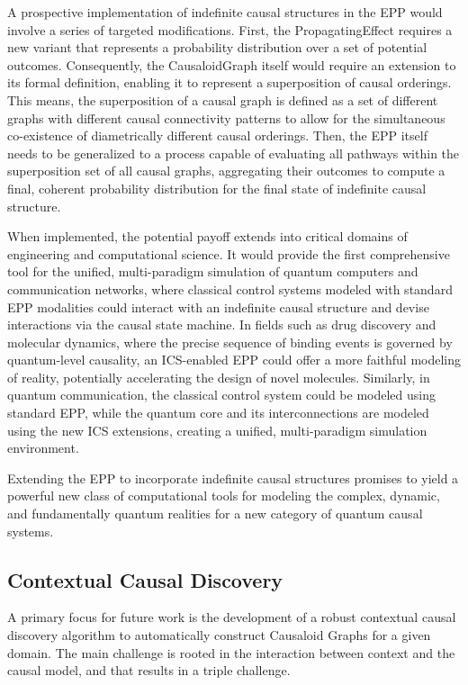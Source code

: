 A prospective implementation of indefinite causal structures in the EPP would involve a series of targeted modifications. First, the PropagatingEffect requires a new variant that represents a probability distribution over a set of potential outcomes. Consequently, the CausaloidGraph itself would require an extension to its formal definition, enabling it to represent a superposition of causal orderings. This means, the superposition of a causal graph is defined as a set of different graphs with different causal connectivity patterns to allow for the simultaneous co-existence of diametrically different causal orderings. Then, the EPP itself needs to be generalized to a process capable of evaluating all pathways within the superposition set of all causal graphs, aggregating their outcomes to compute a final, coherent probability distribution for the final state of indefinite causal structure.

When implemented, the potential payoff extends into critical domains of engineering and computational science. It would provide the first comprehensive tool for the unified, multi-paradigm simulation of quantum computers and communication networks, where classical control systems modeled with standard EPP modalities could interact with an indefinite causal structure and devise interactions via the causal state machine. In fields such as drug discovery and molecular dynamics, where the precise sequence of binding events is governed by quantum-level causality, an ICS-enabled EPP could offer a more faithful modeling of reality, potentially accelerating the design of novel molecules. Similarly, in quantum communication, the classical control system could be modeled using standard EPP, while the quantum core and its interconnections are modeled using the new ICS extensions, creating a unified, multi-paradigm simulation environment.

Extending the EPP to incorporate indefinite causal structures promises to yield a powerful new class of computational tools for modeling the complex, dynamic, and fundamentally quantum realities for a new category of quantum causal systems.  
 
\subsection{Contextual Causal Discovery}


A primary focus for future work is the development of a robust contextual causal discovery algorithm to automatically construct Causaloid Graphs for a given domain. The main challenge is rooted in the interaction between context and the causal model, and that results in a triple challenge.

